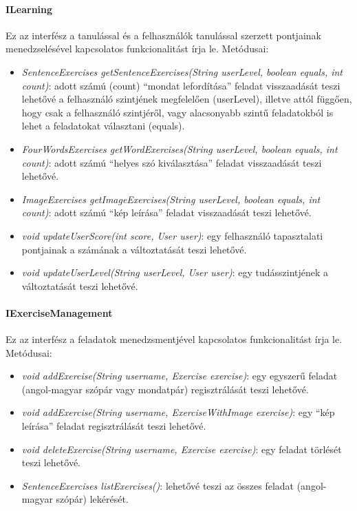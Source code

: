 \documentclass[11pt, a4paper]{article}
\begin{document}
    \paragraph{ILearning} Ez az interfész a tanulással és a felhasználók tanulással szerzett pontjainak menedzselésével kapcsolatos funkcionalitást írja le. Metódusai:
    \begin{itemize}
    	\item \textsl{SentenceExercises getSentenceExercises(String userLevel, boolean equals, int count)}: adott számú (count) ``mondat lefordítása'' feladat visszaadását teszi lehetővé a felhasználó szintjének megfelelően (userLevel), illetve attól függően, hogy csak a felhasználó szintjéről, vagy alacsonyabb szintű feladatokból is lehet a feladatokat választani (equals).
    	
    	\item \textsl{FourWordsExercises getWordExercises(String userLevel, boolean equals, int count)}: adott számú ``helyes szó kiválasztása'' feladat visszaadását teszi lehetővé.
    	
    	\item \textit{ImageExercises getImageExercises(String userLevel, boolean equals, int count)}: adott számú ``kép leírása'' feladat visszaadását teszi lehetővé.
    	
    	\item \textit{void updateUserScore(int score, User user)}: egy felhasználó tapasztalati pontjainak a számának a változtatását teszi lehetővé.
    	
    	\item \textit{void updateUserLevel(String userLevel, User user)}: egy tudásszintjének a változtatását teszi lehetővé.
    \end{itemize}
    \paragraph{IExerciseManagement} Ez az interfész a feladatok menedzsmentjével kapcsolatos funkcionalitást írja le. Metódusai:
    \begin{itemize}
    	\item \textsl{void addExercise(String username, Exercise exercise)}: egy egyszerű feladat (angol-magyar szópár vagy mondatpár) regisztrálását teszi lehetővé.
    	
    	\item \textsl{void addExercise(String username, ExerciseWithImage exercise)}: egy  ``kép leírása'' feladat regisztrálását teszi lehetővé.
    	
    	\item \textsl{void deleteExercise(String username, Exercise exercise)}: egy feladat törlését teszi lehetővé.
    	
    	\item \textsl{SentenceExercises listExercises()}: lehetővé teszi az összes feladat (angol-magyar szópár) lekérését.
    \end{itemize}
    
\end{document}
